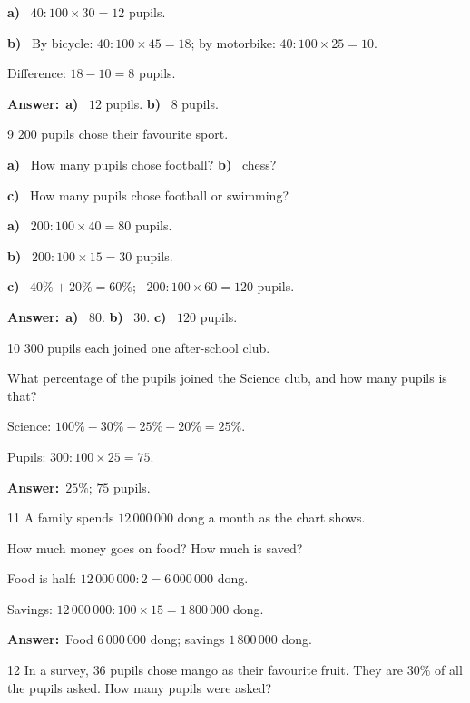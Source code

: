 \documentclass[11pt]{article}
\newif\ifsol \solfalse
\providecommand{\AnsWord}{Đáp số}
\newcommand{\dapso}[1]{\par\textbf{\AnsWord:}\ #1}
\newcommand{\probsol}[1]{%
  \begin{lrbox}{\solmeasure}\begin{minipage}{\dimexpr\linewidth-24pt\relax}#1\end{minipage}\end{lrbox}%
  \ifsol
    \begin{solbox}#1\end{solbox}%
  \else
    \setlength{\solht}{\dimexpr\ht\solmeasure+\dp\solmeasure+0.85cm\relax}%
    \ifdim\solht<1.35cm\setlength{\solht}{1.35cm}\fi
    \begin{tcolorbox}[colback=white,colframe=Line,boxrule=0.8pt,arc=5pt,
      left=8pt,right=8pt,top=4pt,bottom=4pt,height=\solht]{\footnotesize\color{Slate}\itshape\WorkWord}\end{tcolorbox}%
  \fi}
\newcommand{\pa}[1]{\textbf{#1)}\ }
\newcommand{\gap}{\vspace{0.3cm}}
\def\WorkWord{Your work:}
\def\AnsWord{Answer}
\begin{document}
\probsol{
\pa{a} $40:100\times30=12$ pupils.\par
\pa{b} By bicycle: $40:100\times45=18$; by motorbike: $40:100\times25=10$.\par Difference: $18-10=8$ pupils.
\dapso{\pa{a} $12$ pupils. \pa{b} $8$ pupils.}}
\gap
\needspace{7.5cm}
\begin{probbox}{9}{\relax}
$200$ pupils chose their favourite sport.
\begin{center}
\end{center}
\pa{a} How many pupils chose football? \quad \pa{b} chess?\par
\pa{c} How many pupils chose football or swimming?
\end{probbox}
\probsol{
\pa{a} $200:100\times40=80$ pupils.\par
\pa{b} $200:100\times15=30$ pupils.\par
\pa{c} $40\%+20\%=60\%$; \ $200:100\times60=120$ pupils.
\dapso{\pa{a} $80$. \pa{b} $30$. \pa{c} $120$ pupils.}}
\gap
\needspace{7.5cm}
\begin{probbox}{10}{\relax}
$300$ pupils each joined one after-school club.
\begin{center}
\end{center}
What percentage of the pupils joined the Science club, and how many pupils is that?
\end{probbox}
\probsol{
Science: $100\%-30\%-25\%-20\%=25\%$.\par Pupils: $300:100\times25=75$.
\dapso{$25\%$; $75$ pupils.}}
\gap
\needspace{7.5cm}
\begin{probbox}{11}{\relax}
A family spends $12\,000\,000$ dong a month as the chart shows.
\begin{center}
\end{center}
How much money goes on food? How much is saved?
\end{probbox}
\probsol{
Food is half: $12\,000\,000:2=6\,000\,000$ dong.\par
Savings: $12\,000\,000:100\times15=1\,800\,000$ dong.
\dapso{Food $6\,000\,000$ dong; savings $1\,800\,000$ dong.}}
\gap
\begin{probbox}{12}{\relax}
In a survey, $36$ pupils chose mango as their favourite fruit. They are $30\%$ of all the pupils asked. How many pupils were asked?
\end{probbox}
\end{document}

